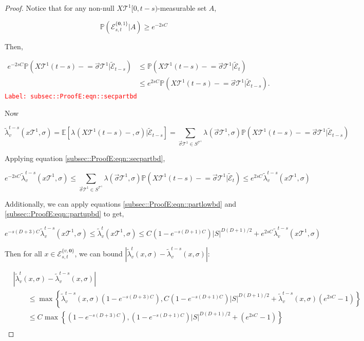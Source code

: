 \documentclass[12pt]{article}
\newcommand{\mb}{\mathbb}
\newcommand{\mc}{\mathcal}
\newcommand{\tr}{\textcolor{red}}
\newcommand{\labe}[1]{\tr{\texttt{Label: #1}}}
\newcommand{\pr}{\mb{P}}							%
\newcommand{\ex}[1]{\mb{E}\left[#1\right]}			%
\renewcommand{\root}{\mathbf{0}}				%
\renewcommand{\v}{v}							%
\renewcommand{\S}{S}							%
\newcommand{\s}{\sigma}							%
\newcommand{\sv}{\vec{\s}}						%
\newcommand{\x}{x}								%
\renewcommand{\t}{t}							%
\renewcommand{\tt}{s}							%
\newcommand{\X}{X}								%
\newcommand{\degr}{D}								%
\newcommand{\pup}[1]{^{#1}}							%
\newcommand{\tree}{\mc{T}}							%
\newcommand{\XState}[1]{\S^{#1}}				%
\newcommand{\rate}[1]{\lambda_{#1}}					%
\newcommand{\crate}[2]{\alt{\lambda}_{#1}^{#2}}		%
\newcommand{\const}[1]{C_{#1}}						%
\newcommand{\alt}{\widetilde}						%
\newcommand{\evnt}{\mc{E}}						%
\newcommand{\typset}{A}							%
\begin{document}
\begin{proof}
Notice that for any non-null \(\X{\tree\pup{1}}{[0,\t-\tt)}\)-measurable set \(\typset\), 

\[\pr(\evnt^{\{\root,1\}}_{\tt,\t}|\typset) \geq e^{-2\tt\const{}}\]

Then,

\begin{align}
e^{-2\tt\const{}}\pr\left(\X{\tree\pup{1}}{(\t-\tt)-}=\sv{}{\tree\pup{1}}|\alt{\evnt}_{\t-\tt}\right) &\leq \pr\left(\X{\tree\pup{1}}{(\t-\tt)-}=\sv{}{\tree\pup{1}}|\alt{\evnt}_{\t}\right)\nonumber\\
&\leq e^{2\tt\const{}}\pr\left(\X{\tree\pup{1}}{(\t-\tt)-}=\sv{}{\tree\pup{1}}|\alt{\evnt}_{\t-\tt}\right).
\label{subsec::ProofE:eqn::secpartbd}
\end{align}
\labe{subsec::ProofE:eqn::secpartbd}

Now

\[\crate{\v}{\t-\tt}(\x{\tree\pup{1}}{},\s) = \ex{\rate{}(\X{\tree\pup{1}}{(\t-\tt)-},\s)|\alt{\evnt}_{\t-\tt}} = \sum_{\sv{}{\tree\pup{1}}\in \S^{\tree\pup{1}}}\rate{}(\sv{}{\tree\pup{1}},\s)\pr\left(\X{\tree\pup{1}}{(\t-\tt)-} = \sv{}{\tree\pup{1}}|\alt{\evnt}_{\t-\tt}\right)\]

Applying equation \eqref{subsec::ProofE:eqn::secpartbd},

\[e^{-2\tt\const{}}\crate{\v}{\t-\tt}(\x{\tree\pup{1}}{},\s) \leq \sum_{\sv{}{\tree\pup{1}}\in \S^{\tree\pup{1}}} \lambda(\sv{}{\tree\pup{1}},\s)\pr(\X{\tree\pup{1}}{(\t-\tt)-} = \sv{}{\tree\pup{1}}|\alt{\evnt}_\t)\leq e^{2\tt\const{}}\crate{\v}{\t-\tt}(\x{\tree\pup{1}}{},\s)\]

Additionally, we can apply equations \eqref{subsec::ProofE:eqn::partlowbd} and  \eqref{subsec::ProofE:eqn::partupbd} to get,

\[e^{-\tt(\degr+3)\const{}}\crate{\v}{\t-\tt}(\x{\tree\pup{1}}{},\s) \leq \crate{\v}{\t}(\x{\tree\pup{1}}{},\s) \leq \const{}(1 - e^{-\tt(\degr+1)\const{}})|S|^{\degr(\degr+1)/2} + e^{2\tt\const{}}\crate{\v}{\t-\tt}(\x{\tree\pup{1}}{},\s)\]

Then for all \(\x{}{} \in \evnt^{\{\v,\root\}}_{\tt,\t}\), we can bound \(|\crate{\v}{\t}(\x{}{},\s) - \crate{\v}{\t-\tt}(\x{}{},\s)|\):

\begin{align*}
&|\crate{\v}{\t}(\x{}{},\s) - \crate{\v}{\t-\tt}(\x{}{},\s)| \\
&\hspace{24pt}\leq \max\left\{\crate{\v}{\t-\tt}(\x{}{},\s)\left(1 - e^{-\tt(\degr+3)\const{}}\right),\const{}(1-e^{-\tt(\degr+1)\const{}})|\S|^{\degr(\degr+1)/2} + \crate{\v}{\t-\tt}(\x{}{},\s)\left(e^{2\tt\const{}} - 1\right)\right\}\\
&\hspace{24pt}\leq \const{}\max\left\{\left(1 - e^{-\tt(\degr+3)\const{}}\right),(1-e^{-\tt(\degr+1)\const{}})|\S|^{\degr(\degr+1)/2} + \left(e^{2\tt\const{}} - 1\right)\right\}\\
\end{align*}


\end{proof}
\end{document}
